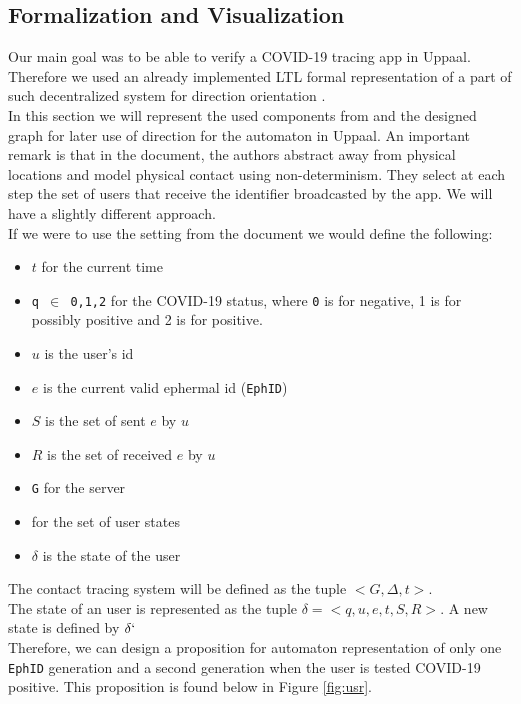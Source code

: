 \documentclass[a4paper, twocolumn]{article}
\begin{document}
\subsection{Formalization and Visualization} \label{formVis}
Our main goal was to be able to verify a COVID-19 tracing app in Uppaal. Therefore we used an already implemented LTL formal representation of a part of such decentralized system for direction orientation \cite{formalization}.\\
In this section we will represent the used components from \cite{formalization} and the designed graph for later use of direction for the automaton in Uppaal. An important remark is that in the document, the authors abstract away from physical locations and model physical contact using non-determinism. They select at each step the set of users that receive the identifier broadcasted by the app. We will have a slightly different approach.\\
If we were to use the setting from the document we would define the following:
\begin{itemize}

    \item \texttt{$t$} for the current time
    \item \texttt{q $\in$ {0,1,2}} for the COVID-19 status, where \texttt{0} is for negative, 1 is for possibly positive and 2 is for positive.
    \item \texttt{$u$} is the user's id
    \item \texttt{$e$} is the current valid ephermal id (\texttt{EphID})
    \item \texttt{$S$} is the set of sent \texttt{$e$} by \texttt{$u$} 
    \item \texttt{$R$} is the set of received \texttt{$e$} by \texttt{$u$} 
    \item \texttt{G} for the server
    \item \text{$\Delta$} for the set of user states
    \item \texttt{$\delta$} is the state of the user
\end{itemize}
The contact tracing system will be defined as the tuple \colorbox{backcolour}{$< G, \Delta, t >$}.\\
The state of an user is represented as the tuple \colorbox{backcolour}{$\delta = < q,u,e,t,S,R >$}. A new state is defined by \texttt{$\delta`$}\\
Therefore, we can design a proposition for automaton representation of only one \texttt{EphID} generation and a second generation when the user is tested COVID-19 positive. This proposition is found below in Figure \ref{fig:usr}.
\end{document}
